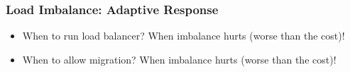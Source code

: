 \begin{frame}
\frametitle{Load Imbalance: Adaptive Response}
\begin{itemize}
\item When to run load balancer? When imbalance hurts (worse than the cost)!
\item When to allow migration? \pause When imbalance hurts (worse than the cost)!
\end{itemize}
\end{frame}
